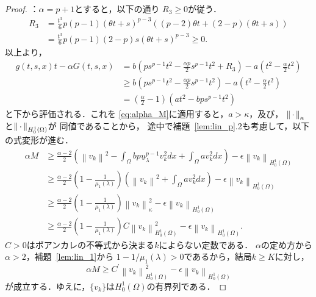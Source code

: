 \begin{proof}
 ：$\alpha = p + 1$とすると，以下の通り
 $R_3 \geq 0$が従う．
 \begin{align*}
  R_3 &= \frac{t^3}{6} p(p-1)(\theta t + s)^{p-3} \left( (p-2)\theta t
  + (2-p) (\theta t + s)\right) \\
  &= \frac{t^3}{6}p(p-1)(2-p) s (\theta t + s)^{p-3} \geq 0.
 \end{align*}
 以上より，
 \begin{align*}
  g(t, s, x)t - \alpha G(t, s, x) &= b\left( ps^{p-1}t^2 -
  \frac{\alpha p}{2} s^{p-1} t^2 + R_3 \right) - a \left( t^2 -
  \frac{\alpha}{2} t^2 \right) \\
  & \geq b\left( ps^{p-1}t^2 -
  \frac{\alpha p}{2} s^{p-1} t^2 \right) - a \left( t^2 -
  \frac{\alpha}{2} t^2 \right) \\
  & = \left( \frac{\alpha}{2} - 1 \right) \left( at^2 - bps^{p-1} t^2 \right)
 \end{align*}
 と下から評価される．これを
 \eqref{eq:alpha_M}に適用すると，$a >
 \kappa$，及び，
 $\left\|\, \cdot \, \right\|_\kappa$と$\left\|\, \cdot \, \right\|_{H_0^1(\Omega)}$が
 同値であることから，
 途中で補題~\ref{lem:lin_p}.2も考慮して，以下の式変形が進む．
 \begin{align*}
  \alpha M &\geq \frac{\alpha-2}{2} \left( \left\| v_k \right\|^2 -
  \int_\Omega bp \underline{u}_\lambda^{p-1} v_k^2 dx + \int_\Omega
  av_k^2 dx \right) - \epsilon \left\| v_k \right\|_{H_0^1(\Omega)} \\
  & \geq \frac{\alpha -2}{2} \left( 1 - \frac{1}{\mu_1(\lambda)} \right)
  \left( \left\| v_k \right\|^2 + \int_\Omega av_k^2 dx \right)
  - \epsilon \left\|
  v_k \right\|_{H_0^1(\Omega)} \\
  & \geq \frac{\alpha -2}{2} \left( 1 - \frac{1}{\mu_1(\lambda)}
  \right) \left\| v_k \right\|_\kappa^2
  - \epsilon \left\|
  v_k \right\|_{H_0^1(\Omega)} \\
  & \geq  \frac{\alpha -2}{2} \left( 1 - \frac{1}{\mu_1(\lambda)}
  \right) C \left\| v_k \right\|_{H_0^1(\Omega)}^2 - \epsilon \left\|
  v_k \right\|_{H_0^1(\Omega)}.
 \end{align*}
 $C >0$はポアンカレの不等式から決まる$k$によらない定数である．
 $\alpha$の定め方から$\alpha > 2$，補題~\ref{lem:lin_1}から
 $1 - 1/\mu_1(\lambda) > 0$であるから，結局$k \geq K$に対し，
 \[
  \alpha M \geq C^\prime \left\| v_k \right\|_{H_0^1(\Omega)}^2 - \epsilon
 \left\| v_k \right\|_{H_0^1(\Omega)}
 \]
 が成立する．ゆえに，$\{ v_k \}$は$H_0^1(\Omega)$の有界列である． \qedhere
\end{proof}

